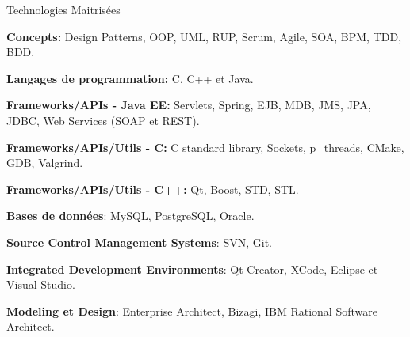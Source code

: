 \documentclass{resume}
\begin{document}
  \begin{rSection}{Technologies Maitrisées}
    \begin{rSubsection}{}{}{}{}
      \item {\bf Concepts:} Design Patterns, OOP, UML, RUP, Scrum, Agile, SOA, BPM, TDD, BDD.
      \item {\bf Langages de programmation:} C, C++ et Java.
      \item {\bf Frameworks/APIs - Java EE:} Servlets, Spring, EJB, MDB, JMS, JPA, JDBC, Web Services (SOAP et REST).
      \item {\bf Frameworks/APIs/Utils - C:} C standard library, Sockets, p\_threads, CMake, GDB, Valgrind.
      \item {\bf Frameworks/APIs/Utils - C++:} Qt, Boost, STD, STL.
      \item {\bf Bases de données}: MySQL, PostgreSQL, Oracle.
      \item {\bf Source Control Management Systems}: SVN, Git.
      \item {\bf Integrated Development Environments}: Qt Creator, XCode, Eclipse et Visual Studio.
      \item {\bf Modeling et Design}: Enterprise Architect, Bizagi, IBM Rational Software Architect.
    \end{rSubsection}
  \end{rSection}
\end{document}
